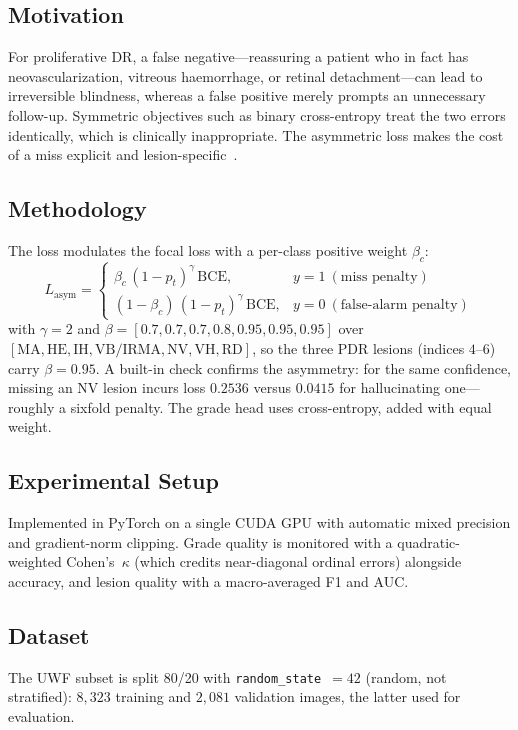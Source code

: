 \documentclass[journal,twoside,web]{ieeecolor}
\begin{document}
\subsection{Motivation}
For proliferative DR, a false negative---reassuring a patient who in fact has
neovascularization, vitreous haemorrhage, or retinal detachment---can lead to
irreversible blindness, whereas a false positive merely prompts an unnecessary
follow-up. Symmetric objectives such as binary cross-entropy treat the two errors
identically, which is clinically inappropriate. The asymmetric loss makes the cost
of a miss explicit and lesion-specific~\cite{asl,focalloss}.

\subsection{Methodology}
The loss modulates the focal loss with a per-class positive weight $\beta_c$:
\begin{equation}
L_{\mathrm{asym}} =
\begin{cases}
\beta_c\,(1-p_t)^{\gamma}\,\mathrm{BCE}, & y=1 \ (\text{miss penalty})\\[2pt]
(1-\beta_c)\,(1-p_t)^{\gamma}\,\mathrm{BCE}, & y=0 \ (\text{false-alarm penalty})
\end{cases}
\label{eq:asym}
\end{equation}
with $\gamma=2$ and $\beta = [0.7,0.7,0.7,0.8,0.95,0.95,0.95]$ over
$[\text{MA},\text{HE},\text{IH},\text{VB/IRMA},\text{NV},\text{VH},\text{RD}]$, so
the three PDR lesions (indices $4$--$6$) carry $\beta=0.95$. A built-in check
confirms the asymmetry: for the same confidence, missing an NV lesion incurs loss
$0.2536$ versus $0.0415$ for hallucinating one---roughly a sixfold penalty. The
grade head uses cross-entropy, added with equal weight.

\subsection{Experimental Setup}
Implemented in PyTorch on a single CUDA GPU with automatic mixed precision and
gradient-norm clipping. Grade quality is monitored with a quadratic-weighted
Cohen's~$\kappa$ (which credits near-diagonal ordinal errors) alongside accuracy,
and lesion quality with a macro-averaged F1 and AUC.

\subsection{Dataset}
The UWF subset is split 80/20 with \texttt{random\_state}~$=42$ (random, not
stratified): $8{,}323$ training and $2{,}081$ validation images, the latter used for
evaluation.
\end{document}
